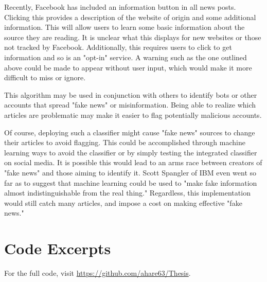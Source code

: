 \documentclass [12 pt] {report}
\begin{document}
Recently, Facebook has included an information button in all news posts. Clicking this provides a description of the website of origin and some additional information. This will allow users to learn some basic information about the source they are reading. It is unclear what this displays for new websites or those not tracked by Facebook. Additionally, this requires users to click to get information and so is an "opt-in" service. A warning such as the one outlined above could be made to appear without user input, which would make it more difficult to miss or ignore.

This algorithm may be used in conjunction with others to identify bots or other accounts that spread "fake news" or misinformation. Being able to realize which articles are problematic may make it easier to flag potentially malicious accounts.

Of course, deploying such a classifier might cause "fake news" sources to change their articles to avoid flagging. This could be accomplished through machine learning ways to avoid the classifier or by simply testing the integrated classifier on social media. It is possible this would lead to an arms race between creators of "fake news" and those aiming to identify it. Scott Spangler of IBM even went so far as to suggest that machine learning could be used to "make fake information almost indistinguishable from the real thing." \cite{quotes} Regardless, this implementation would still catch many articles, and impose a cost on making effective "fake news."
\appendix
\chapter{Code Excerpts}
For the full code, visit \url{https://github.com/ahare63/Thesis}.
\singlespacing
\label{SVMHyperparameters}
\end{document}
